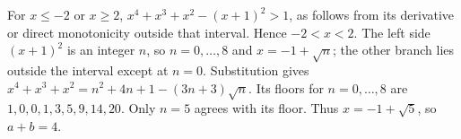 For $x\le-2$ or $x\ge2$, $x^4+x^3+x^2-(x+1)^2>1$, as follows from its derivative or direct monotonicity outside that interval. Hence $-2<x<2$. The left side $(x+1)^2$ is an integer $n$, so $n=0,\ldots,8$ and $x=-1+\sqrt n$; the other branch lies outside the interval except at $n=0$. Substitution gives $x^4+x^3+x^2=n^2+4n+1-(3n+3)\sqrt n$. Its floors for $n=0,\ldots,8$ are $1,0,0,1,3,5,9,14,20$. Only $n=5$ agrees with its floor. Thus $x=-1+\sqrt5$, so $\boxed{a+b=4}$.
